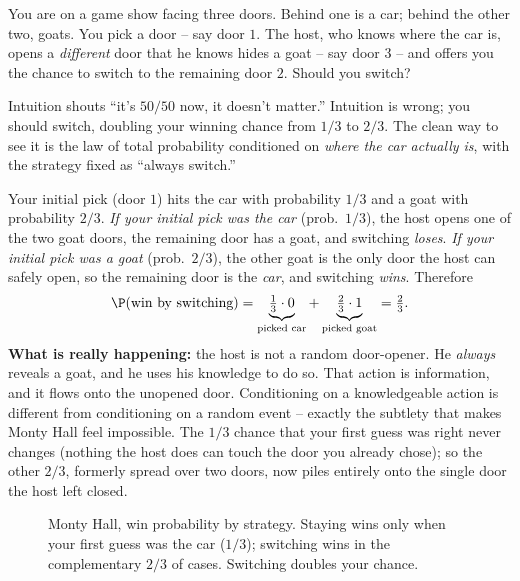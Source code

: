 \begin{paradoxbox}
You are on a game show facing three doors. Behind one is a car; behind the other two, goats. You pick a door -- say door $1$. The host, who knows where the car is, opens a \emph{different} door that he knows hides a goat -- say door $3$ -- and offers you the chance to switch to the remaining door $2$. Should you switch?

Intuition shouts ``it's $50/50$ now, it doesn't matter.'' Intuition is wrong; you should switch, doubling your winning chance from $1/3$ to $2/3$. The clean way to see it is the law of total probability conditioned on \emph{where the car actually is}, with the strategy fixed as ``always switch.''

Your initial pick (door $1$) hits the car with probability $1/3$ and a goat with probability $2/3$. \emph{If your initial pick was the car} (prob.\ $1/3$), the host opens one of the two goat doors, the remaining door has a goat, and switching \emph{loses}. \emph{If your initial pick was a goat} (prob.\ $2/3$), the other goat is the only door the host can safely open, so the remaining door is the \emph{car}, and switching \emph{wins}. Therefore
\[
\P(\text{win by switching}) = \underbrace{\tfrac13\cdot 0}_{\text{picked car}} + \underbrace{\tfrac23\cdot 1}_{\text{picked goat}} = \tfrac23.
\]
\textbf{What is really happening:} the host is not a random door-opener. He \emph{always} reveals a goat, and he uses his knowledge to do so. That action is information, and it flows onto the unopened door. Conditioning on a knowledgeable action is different from conditioning on a random event -- exactly the subtlety that makes Monty Hall feel impossible. The $1/3$ chance that your first guess was right never changes (nothing the host does can touch the door you already chose); so the other $2/3$, formerly spread over two doors, now piles entirely onto the single door the host left closed.
\end{paradoxbox}

\begin{figure}[H]
\centering
{}
\caption{Monty Hall, win probability by strategy. Staying wins only when your first guess was the car ($1/3$); switching wins in the complementary $2/3$ of cases. Switching doubles your chance.}
\label{ch04:fig-monty}
\end{figure}

